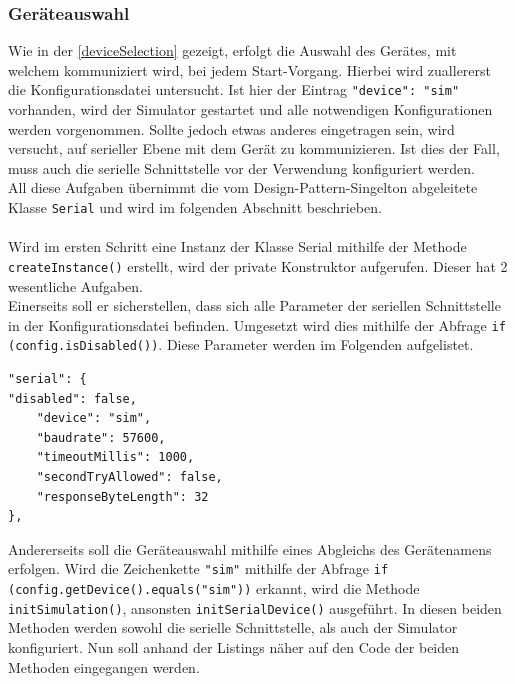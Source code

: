 \subsubsection{Geräteauswahl} \label{sssec:deviceSelection}
Wie in der \autoref{deviceSelection} gezeigt, erfolgt die Auswahl des Gerätes, mit welchem kommuniziert wird, bei jedem Start-Vorgang.
Hierbei wird zuallererst die Konfigurationsdatei untersucht.
Ist hier der Eintrag \lstinline[style=json]{"device": "sim"} vorhanden, wird der Simulator gestartet und alle notwendigen Konfigurationen werden vorgenommen.
Sollte jedoch etwas anderes eingetragen sein, wird versucht, auf serieller Ebene mit dem Gerät zu kommunizieren.
Ist dies der Fall, muss auch die serielle Schnittstelle vor der Verwendung konfiguriert werden.\\
All diese Aufgaben übernimmt die vom Design-Pattern-Singelton abgeleitete Klasse \lstinline[style=java]{Serial} und wird im folgenden Abschnitt beschrieben.\\\\
Wird im ersten Schritt eine Instanz der Klasse Serial mithilfe der Methode \lstinline[style=java]{createInstance()} erstellt, wird der private Konstruktor aufgerufen.
Dieser hat 2 wesentliche Aufgaben.\\
Einerseits soll er sicherstellen, dass sich alle Parameter der seriellen Schnittstelle in der Konfigurationsdatei befinden.
Umgesetzt wird dies mithilfe der Abfrage \lstinline[style=java]{if (config.isDisabled())}.
Diese Parameter werden im Folgenden aufgelistet.
\begin{lstlisting}[style=json,caption=Teilabschnitt Konfigurationsdatei,label=jsonSerial]
"serial": {
"disabled": false,
    "device": "sim",
    "baudrate": 57600,
    "timeoutMillis": 1000,
    "secondTryAllowed": false,
    "responseByteLength": 32
},
\end{lstlisting}
\newpage
Andererseits soll die Geräteauswahl mithilfe eines Abgleichs des Gerätenamens erfolgen.
Wird die Zeichenkette \lstinline[style=json]{"sim"} mithilfe der Abfrage \lstinline[style=java]{if (config.getDevice().equals("sim"))} erkannt, wird die Methode \lstinline[style=java]{initSimulation()}, ansonsten \lstinline[style=java]{initSerialDevice()} ausgeführt.
In diesen beiden Methoden werden sowohl die serielle Schnittstelle, als auch der Simulator konfiguriert.
Nun soll anhand der Listings näher auf den Code der beiden Methoden eingegangen werden.
